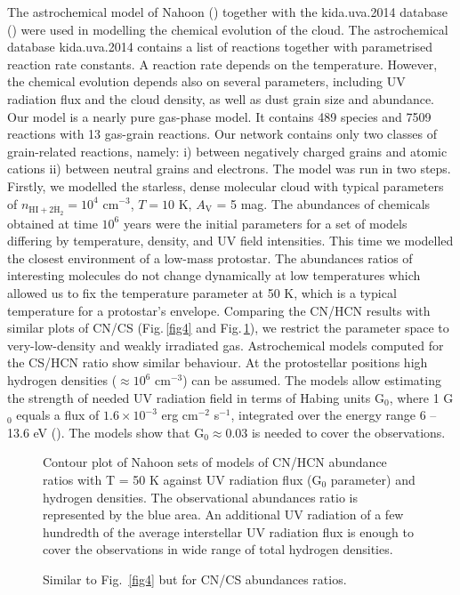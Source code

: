 \documentclass[a4paper]{article}
\begin{document}
\indent \indent The astrochemical model of Nahoon (\cite{wakelam2012}) together with the kida.uva.2014 database (\cite{wakelam2015}) were used in modelling the chemical evolution of the cloud. The astrochemical database kida.uva.2014 contains a list of reactions together with parametrised reaction rate constants. A reaction rate depends on the temperature. However, the chemical evolution depends also on several parameters, including UV radiation flux and the cloud density, as well as dust grain size and abundance. Our model is a nearly pure gas-phase model. It contains 489 species and 7509 reactions with 13 gas-grain reactions. Our network contains only two classes of grain-related reactions, namely: i) between negatively charged grains and atomic cations ii) between neutral grains and electrons. The model was run in two steps. Firstly, we modelled the starless, dense molecular cloud with typical parameters of $n_\mathrm{HI+2 \dot H_2} = 10^4$ cm$^{-3}$, $T = 10$ K, $A_\mathrm{V}$ = 5 mag. The abundances of chemicals obtained at time $10^6$ years were the initial parameters for a set of models differing by temperature, density, and UV field intensities. This time we modelled the closest environment of a low-mass protostar. The abundances ratios of interesting molecules do not change dynamically at low temperatures which allowed us to fix the temperature parameter at 50 K, which is a typical temperature for a protostar's envelope. Comparing the CN/HCN results with similar plots of CN/CS (Fig.\,\ref{fig4} and Fig.\,\ref{fig5}), we restrict the parameter space to very-low-density and weakly irradiated gas. Astrochemical models computed for the CS/HCN ratio show similar behaviour. At the protostellar positions high hydrogen densities ($\approx 10^6$ cm$^{-3}$) can be assumed. The models allow estimating the strength of needed UV radiation field in terms of Habing units G$_0$, where 1 G$_0$ equals a flux of $1.6 \times 10^{-3}$ erg cm$^{-2}$ s$^{-1}$, integrated over the energy range 6 – 13.6 eV (\cite{habing1968}). The models show that G$_0 \approx 0.03$ is needed to cover the observations. 

\begin{figure}[!h]
\centering
\begin{minipage}[t]{.45\linewidth}
\centering
{}
\caption{Contour plot of Nahoon sets of models of CN/HCN abundance ratios with T = 50 K against UV radiation flux (G$_0$ parameter) and hydrogen densities. The observational abundances ratio is represented by the blue area. An additional UV radiation of a few hundredth of the average interstellar UV radiation flux is enough to cover the observations in wide range of total hydrogen densities.}\label{fig4}
\end{minipage}
\hfill
\begin{minipage}[t]{.45\linewidth}
\centering
{}
\caption{Similar to Fig.~\ref{fig4} but for CN/CS abundances ratios.}\label{fig5}
\end{minipage}
\end{figure}
\end{document}
